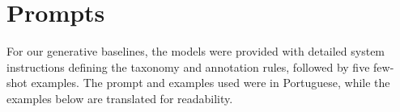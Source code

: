 \documentclass[11pt]{article}
\begin{document}






\section{Prompts}
\label{app:appendix_prompts}

For our generative baselines, the models were provided with detailed system instructions defining the taxonomy and annotation rules, followed by five few-shot examples. The prompt and examples used were in Portuguese, while the examples below are translated for readability.
\end{document}
